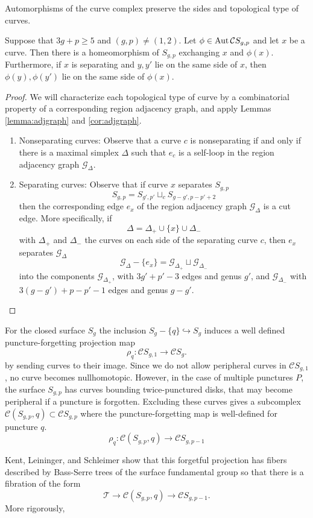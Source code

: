 \begin{lemma}
  Automorphisms of the curve complex preserve the sides and topological type of curves.

  Suppose that $3g+p \geq 5$ and $(g,p)\neq(1,2)$.
  Let $\phi \in \operatorname{Aut} \mathcal C S_{g,p}$ and let $x$ be a curve.
  Then there is a homeomorphism of $S_{g,p}$ exchanging $x$ and $\phi(x)$.
  Furthermore, if $x$ is separating and $y,y'$ lie on the same side of $x$,
  then $\phi(y),\phi(y')$ lie on the same side of $\phi(x)$.
  \label{lemma:curvetype}
\end{lemma}
\begin{proof}
  We will characterize each topological type of curve
  by a combinatorial property of a corresponding region adjacency graph,
  and apply Lemmas
  \ref{lemma:adjgraph} and \ref{cor:adjgraph}.

  \begin{enumerate}[$\cdot$]
    \item Nonseparating curves:
    Observe that a curve $c$ is nonseparating if and only if
    there is a maximal simplex $\Delta$ such that $e_c$
    is a self-loop in the region adjacency graph $\mathcal G_\Delta$.
    \item Separating curves:
    Observe that if curve $x$ separates $S_{g,p}$
    $$
    S_{g,p} = S_{g',p'} \sqcup_c S_{g-g',p-p'+2}
    $$
    then the corresponding edge $e_x$ of the
    region adjacency graph
    $\mathcal G_\Delta$
    is a cut edge.
    More specifically, if
    $$\Delta = \Delta_+ \cup \{x\} \cup \Delta_-$$
    with $\Delta_+$ and $\Delta_-$
    the curves on each side of the separating curve $c$,
    then $e_x$ separates $\mathcal G_\Delta$
    $$\mathcal G_\Delta  - \{e_x\}  = \mathcal G_{\Delta_+} \sqcup  \mathcal G_{\Delta_-}$$
    into the components
    $\mathcal G_{\Delta_+}$, with
    $3g'+p'-3$ edges and genus $g'$,
    and $\mathcal G_{\Delta_-}$ with $3(g-g')+p-p'-1$ edges and genus $g-g'$.
  \end{enumerate}
  \end{proof}




\begin{remark}
For the closed surface $S_g$ the inclusion $S_{g}-\{q\} \hookrightarrow S_{g}$
induces a well defined puncture-forgetting projection map
$$
\rho_q: \mathcal C S_{g,1} \to \mathcal C S_g.
$$
by sending curves to their image.
Since we do not allow peripheral curves in $\mathcal C S_{g,1}$, no curve becomes nullhomotopic.
However, in the case of multiple punctures $P$,
the surface $S_{g,p}$ has curves bounding twice-punctured disks,
that may become peripheral if a puncture is forgotten.
Excluding these curves
gives a subcomplex $\mathcal C(S_{g,p},q) \subset \mathcal C S_{g,p}$
where the puncture-forgetting map is well-defined for puncture $q$.
$$
\rho_q: \mathcal C(S_{g,p},q) \to \mathcal C S_{g,p-1}
$$

Kent, Leininger, and Schleimer \cite{MR2599078}
show that this forgetful projection has
fibers described by Bass-Serre trees of the surface fundamental group
so that there is a fibration of the form
$$
\mathcal T \to \mathcal C(S_{g,p},q) \to \mathcal C S_{g,p-1}.
$$
More rigorously,
\end{remark}


